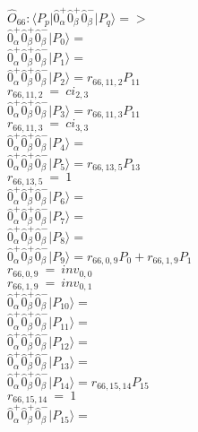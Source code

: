 \documentclass[14pt]{article}
\begin{document}
    $\hat{O}_{66}:  \langle{P_p}\vert \hat{0}_{\alpha}^{+}\hat{0}_{\beta}^{+}\hat{0}_{\beta}^{-} \vert{P_q}\rangle => $ \\ 
    $ \hat{0}_{\alpha}^{+}\hat{0}_{\beta}^{+}\hat{0}_{\beta}^{-} \vert{P_{0}}\rangle =  $ \\ 
    $ \hat{0}_{\alpha}^{+}\hat{0}_{\beta}^{+}\hat{0}_{\beta}^{-} \vert{P_{1}}\rangle =  $ \\ 
    $ \hat{0}_{\alpha}^{+}\hat{0}_{\beta}^{+}\hat{0}_{\beta}^{-} \vert{P_{2}}\rangle = {r}_{66,11,2}P_{11} $ \\ 
    ${r}_{66,11,2}\ =\ {ci}_{2,3} $ \\ 
    $ \hat{0}_{\alpha}^{+}\hat{0}_{\beta}^{+}\hat{0}_{\beta}^{-} \vert{P_{3}}\rangle = {r}_{66,11,3}P_{11} $ \\ 
    ${r}_{66,11,3}\ =\ {ci}_{3,3} $ \\ 
    $ \hat{0}_{\alpha}^{+}\hat{0}_{\beta}^{+}\hat{0}_{\beta}^{-} \vert{P_{4}}\rangle =  $ \\ 
    $ \hat{0}_{\alpha}^{+}\hat{0}_{\beta}^{+}\hat{0}_{\beta}^{-} \vert{P_{5}}\rangle = {r}_{66,13,5}P_{13} $ \\ 
    ${r}_{66,13,5}\ =\ 1 $ \\ 
    $ \hat{0}_{\alpha}^{+}\hat{0}_{\beta}^{+}\hat{0}_{\beta}^{-} \vert{P_{6}}\rangle =  $ \\ 
    $ \hat{0}_{\alpha}^{+}\hat{0}_{\beta}^{+}\hat{0}_{\beta}^{-} \vert{P_{7}}\rangle =  $ \\ 
    $ \hat{0}_{\alpha}^{+}\hat{0}_{\beta}^{+}\hat{0}_{\beta}^{-} \vert{P_{8}}\rangle =  $ \\ 
    $ \hat{0}_{\alpha}^{+}\hat{0}_{\beta}^{+}\hat{0}_{\beta}^{-} \vert{P_{9}}\rangle = {r}_{66,0,9}P_{0}+{r}_{66,1,9}P_{1} $ \\ 
    ${r}_{66,0,9}\ =\ {inv}_{0,0} $ \\ 
    ${r}_{66,1,9}\ =\ {inv}_{0,1} $ \\ 
    $ \hat{0}_{\alpha}^{+}\hat{0}_{\beta}^{+}\hat{0}_{\beta}^{-} \vert{P_{10}}\rangle =  $ \\ 
    $ \hat{0}_{\alpha}^{+}\hat{0}_{\beta}^{+}\hat{0}_{\beta}^{-} \vert{P_{11}}\rangle =  $ \\ 
    $ \hat{0}_{\alpha}^{+}\hat{0}_{\beta}^{+}\hat{0}_{\beta}^{-} \vert{P_{12}}\rangle =  $ \\ 
    $ \hat{0}_{\alpha}^{+}\hat{0}_{\beta}^{+}\hat{0}_{\beta}^{-} \vert{P_{13}}\rangle =  $ \\ 
    $ \hat{0}_{\alpha}^{+}\hat{0}_{\beta}^{+}\hat{0}_{\beta}^{-} \vert{P_{14}}\rangle = {r}_{66,15,14}P_{15} $ \\ 
    ${r}_{66,15,14}\ =\ 1 $ \\ 
    $ \hat{0}_{\alpha}^{+}\hat{0}_{\beta}^{+}\hat{0}_{\beta}^{-} \vert{P_{15}}\rangle =  $ \\ 
    
\end{document}
